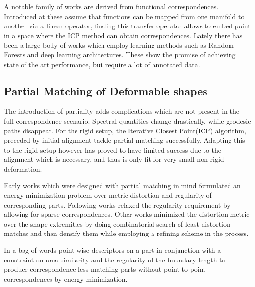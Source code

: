 \documentclass[10pt,twocolumn,letterpaper]{article}
\begin{document}
 A notable family of works are derived from functional correspondences. Introduced at\cite{Ovsjanikov:2012:FMF:2185520.2185526,pokrass2013sparse,kovnatsky2015functional,vestner2017efficient} these assume that functions can be mapped from one manifold to another via a linear operator, finding this transfer operator allows to embed point in a space where the ICP method can obtain correspondences. 
Lately there has been a large body of works which employ learning methods such as Random Forests\cite{Rodola:2014:DNS:2679600.2679987} and deep learning architectures\cite{masci2016geometric,boscaini2016learning,monti2017geometric}. These show the promise of achieving state of the art performance, but require a lot of annotated data.

\subsection{Partial Matching of Deformable shapes}
The introduction of partiality adds complications which are not present in the full correspondence scenario. Spectral quantities change drastically, while geodesic paths disappear.
For the rigid setup, the Iterative Closest Point(ICP)\cite{Aiger:2008:CSR:1360612.1360684} algorithm, preceded by initial alignment\cite{rusu2008towards} tackle partial matching successfully. Adapting this to the rigid setup however has proved to have limited success due to the alignment which is necessary, and thus is only fit for very small non-rigid deformation.

Early works which were designed with partial matching in mind\cite{bronstein2008not,bronstein2009partial} formulated an energy minimization problem over metric distortion and regularity of corresponding parts. Following works relaxed the regularity requirement by allowing for sparse correspondences\cite{Torsello:2012:GAD:2354409.2354702,rodola2013elastic}. 
Other works\cite{sahilliouglu2012scale,sahilliouglu2012minimum} minimized the distortion metric over the shape extremities by doing combinatorial search of least distortion matches and then densify them while employing a refining scheme in the process. 

In\cite{pokrass2013partial} a bag of words point-wise descriptors on a part in conjunction with a constraint on area similarity and the regularity of the boundary length to produce correspondence less matching parts without point to point correspondences by energy minimization.
\end{document}
